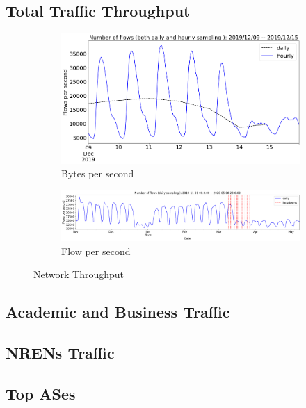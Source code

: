 \documentclass[10pt, journal, letterpaper]{IEEEtran}
\newcommand\linearFigSze{0.48}
\begin{document}
\subsection{Total Traffic Throughput}
\begin{figure}
    \begin{subfigure}{\linearFigSze\textwidth}
          \centering
          \includegraphics[width=\columnwidth]{img/BCH2_flowrate.png}
          \caption{Bytes per second}
          \label{fig:traffic_trend_bps}
    \end{subfigure}
    \begin{subfigure}{\linearFigSze\textwidth}
          \centering
          \includegraphics[width=\columnwidth]{img/traffic_trend_fps.png}
          \caption{Flow per second}
          \label{fig:traffic_trend_fps}
    \end{subfigure}
    \caption{Network Throughput}
    \label{fig:network_throughput}
\end{figure}
\subsection{Academic and Business Traffic}

\subsection{NRENs Traffic}

\subsection{Top ASes}
\end{document}
